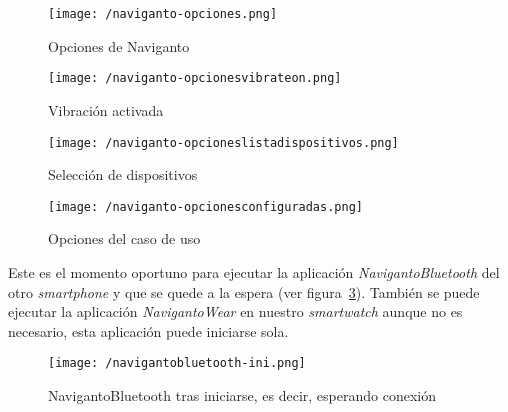 \begin{figure}[!h]
  \begin{minipage}[b]{0.5\linewidth}
    \begin{center}
      \texttt{[image: /naviganto-opciones.png]}
      \caption{Opciones de Naviganto}
      \label{fig:navigantoOpciones}
    \end{center}
  \end{minipage}
  \begin{minipage}[b]{0.5\linewidth}
    \begin{center}
      \texttt{[image: /naviganto-opcionesvibrateon.png]}
      \caption{Vibración activada}
      \label{fig:navignatoOpcionesVibrateOn}
    \end{center}
  \end{minipage}
\end{figure}

\begin{figure}[!h]
  \begin{minipage}[b]{0.5\linewidth}
    \begin{center}
      \texttt{[image: /naviganto-opcioneslistadispositivos.png]}
      \caption{Selección de dispositivos}
      \label{fig:navigantoOpcionesSelecionaDispositivos}
    \end{center}
  \end{minipage}
  \begin{minipage}[b]{0.5\linewidth}
    \begin{center}
      \texttt{[image: /naviganto-opcionesconfiguradas.png]}
      \caption{Opciones del caso de uso}
      \label{fig:navigantoOpcionesCasoDeUso}
    \end{center}
  \end{minipage}
\end{figure}

Este es el momento oportuno para ejecutar la aplicación \emph{NavigantoBluetooth} del otro
\emph{smartphone} y que se quede a la espera (ver
figura~\ref{fig:navigantoBluetoothIniciado}). También se puede ejecutar la aplicación
\emph{NavigantoWear} en nuestro \emph{smartwatch} aunque no es necesario, esta aplicación puede
iniciarse sola.

\begin{figure}[!h]
  \begin{center}
    \texttt{[image: /navigantobluetooth-ini.png]}
    \caption{NavigantoBluetooth tras iniciarse, es decir, esperando conexión}
    \label{fig:navigantoBluetoothIniciado}
  \end{center}
\end{figure}

